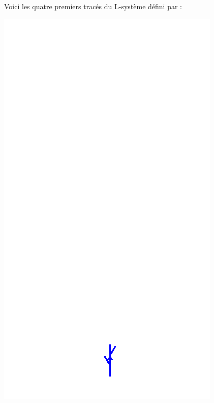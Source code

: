 \documentclass[11pt,class=report,crop=false]{standalone}
\begin{document}
Voici les quatre premiers tracés du L-système défini par :

\begin{center}
\includegraphics[scale=\myscale,scale=0.25]{figures/plante-01-1}

\end{center}
\end{document}
